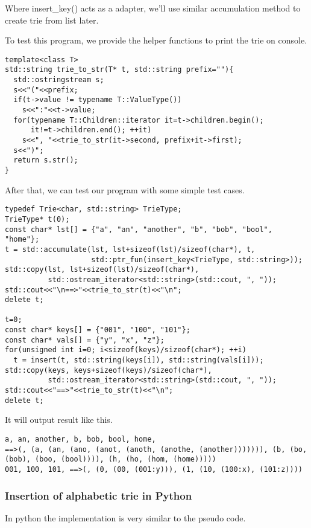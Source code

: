 \documentclass{article}
\begin{document}
Where insert\_key() acts as a adapter, we'll use similar accumulation
method to create trie from list later.

To test this program, we provide the helper functions to print the
trie on console. 

\begin{lstlisting}
template<class T>
std::string trie_to_str(T* t, std::string prefix=""){
  std::ostringstream s;
  s<<"("<<prefix;
  if(t->value != typename T::ValueType())
    s<<":"<<t->value;
  for(typename T::Children::iterator it=t->children.begin();
      it!=t->children.end(); ++it)
    s<<", "<<trie_to_str(it->second, prefix+it->first);
  s<<")";
  return s.str();
}
\end{lstlisting}

After that, we can test our program with some simple test cases.

\begin{lstlisting}
typedef Trie<char, std::string> TrieType;
TrieType* t(0);
const char* lst[] = {"a", "an", "another", "b", "bob", "bool", "home"};
t = std::accumulate(lst, lst+sizeof(lst)/sizeof(char*), t,
                    std::ptr_fun(insert_key<TrieType, std::string>));
std::copy(lst, lst+sizeof(lst)/sizeof(char*),
          std::ostream_iterator<std::string>(std::cout, ", "));
std::cout<<"\n==>"<<trie_to_str(t)<<"\n";
delete t;

t=0;
const char* keys[] = {"001", "100", "101"};
const char* vals[] = {"y", "x", "z"};
for(unsigned int i=0; i<sizeof(keys)/sizeof(char*); ++i)
  t = insert(t, std::string(keys[i]), std::string(vals[i]));
std::copy(keys, keys+sizeof(keys)/sizeof(char*),
          std::ostream_iterator<std::string>(std::cout, ", "));
std::cout<<"==>"<<trie_to_str(t)<<"\n";
delete t;
\end{lstlisting}

It will output result like this.

\begin{verbatim}
a, an, another, b, bob, bool, home, 
==>(, (a, (an, (ano, (anot, (anoth, (anothe, (another))))))), (b, (bo,
(bob), (boo, (bool)))), (h, (ho, (hom, (home)))))
001, 100, 101, ==>(, (0, (00, (001:y))), (1, (10, (100:x), (101:z))))
\end{verbatim}

\subsubsection*{Insertion of alphabetic trie in Python}
In python the implementation is very similar to the pseudo code.
\end{document}
